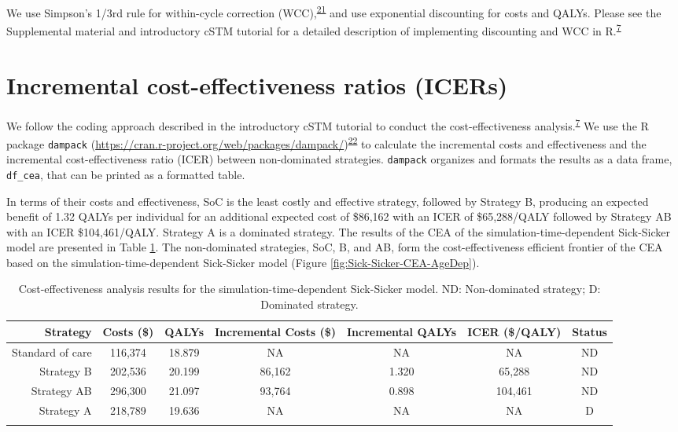 \documentclass[
]{article}
\begin{document}
We use Simpson's 1/3rd rule for within-cycle correction (WCC),\textsuperscript{\protect\hyperlink{ref-Elbasha2016a}{21}} and use exponential discounting for costs and QALYs. Please see the Supplemental material and introductory cSTM tutorial for a detailed description of implementing discounting and WCC in R.\textsuperscript{\protect\hyperlink{ref-Alarid-Escudero2021a}{7}}

\hypertarget{incremental-cost-effectiveness-ratios-icers}{%
\section{Incremental cost-effectiveness ratios (ICERs)}\label{incremental-cost-effectiveness-ratios-icers}}

We follow the coding approach described in the introductory cSTM tutorial to conduct the cost-effectiveness analysis.\textsuperscript{\protect\hyperlink{ref-Alarid-Escudero2021a}{7}} We use the R package \texttt{dampack} (\url{https://cran.r-project.org/web/packages/dampack/})\textsuperscript{\protect\hyperlink{ref-Alarid-Escudero2021}{22}} to calculate the incremental costs and effectiveness and the incremental cost-effectiveness ratio (ICER) between non-dominated strategies. \texttt{dampack} organizes and formats the results as a data frame, \texttt{df\_cea}, that can be printed as a formatted table.

In terms of their costs and effectiveness, SoC is the least costly and effective strategy, followed by Strategy B, producing an expected benefit of 1.32 QALYs per individual for an additional expected cost of \$86,162 with an ICER of \$65,288/QALY followed by Strategy AB with an ICER \$104,461/QALY. Strategy A is a dominated strategy. The results of the CEA of the simulation-time-dependent Sick-Sicker model are presented in Table \ref{tab:table-cea}. The non-dominated strategies, SoC, B, and AB, form the cost-effectiveness efficient frontier of the CEA based on the simulation-time-dependent Sick-Sicker model (Figure \ref{fig:Sick-Sicker-CEA-AgeDep}).

\begin{table}[!h]

\caption{\label{tab:table-cea}Cost-effectiveness analysis results for the simulation-time-dependent Sick-Sicker model. ND: Non-dominated strategy; D: Dominated strategy.}
\centering
\begin{tabular}[t]{rcccccc}
\toprule{}
Strategy & Costs (\$) & QALYs & Incremental Costs (\$) & Incremental QALYs & ICER (\$/QALY) & Status\\
\midrule{}
Standard of care & 116,374 & 18.879 & NA & NA & NA & ND\\
Strategy B & 202,536 & 20.199 & 86,162 & 1.320 & 65,288 & ND\\
Strategy AB & 296,300 & 21.097 & 93,764 & 0.898 & 104,461 & ND\\
Strategy A & 218,789 & 19.636 & NA & NA & NA & D\\
\bottomrule{}
\end{tabular}
\end{table}
\end{document}
